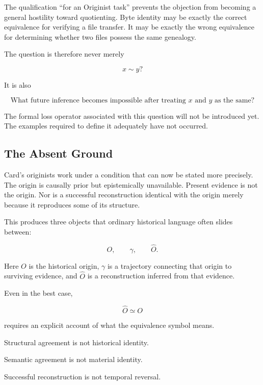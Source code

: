 \documentclass[
  11pt,
  a4paper,
  DIV=12,
  BCOR=0mm,
  parskip=half-
]{scrartcl}
\theoremstyle{definition}
\theoremstyle{plain}
\theoremstyle{remark}
\begin{document}
The qualification \enquote{for an Originist task} prevents the objection from
becoming a general hostility toward quotienting. Byte identity may be exactly
the correct equivalence for verifying a file transfer. It may be exactly the
wrong equivalence for determining whether two files possess the same
genealogy.

The question is therefore never merely

\[
  x\sim y?
\]

It is also

\[
  \text{What future inference becomes impossible after treating }
  x\text{ and }y\text{ as the same?}
\]

The formal loss operator associated with this question will not be introduced
yet. The examples required to define it adequately have not occurred.


\subsection{The Absent Ground}
\label{sec:absent-ground}

Card's originists work under a condition that can now be stated more
precisely. The origin is causally prior but epistemically unavailable.
Present evidence is not the origin. Nor is a successful reconstruction
identical with the origin merely because it reproduces some of its structure.

This produces three objects that ordinary historical language often slides
between:

\[
  O,
  \qquad
  \gamma,
  \qquad
  \widehat O.
\]

Here \(O\) is the historical origin, \(\gamma\) is a trajectory connecting
that origin to surviving evidence, and \(\widehat O\) is a reconstruction
inferred from that evidence.

Even in the best case,

\[
  \widehat O\simeq O
\]

requires an explicit account of what the equivalence symbol means.

Structural agreement is not historical identity.

Semantic agreement is not material identity.

Successful reconstruction is not temporal reversal.
\end{document}

